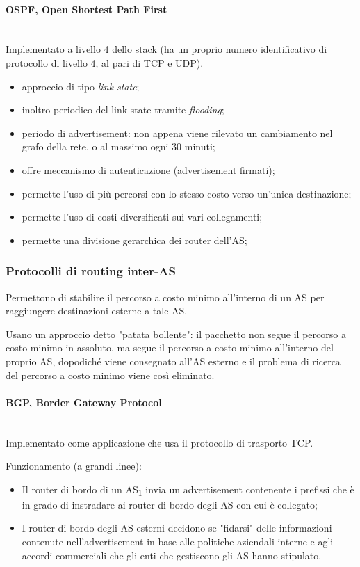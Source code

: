 \documentclass[12pt,a4paper]{article}
\begin{document}
\paragraph{OSPF, Open Shortest Path First}\mbox{}\\
Implementato a livello 4 dello stack (ha un proprio numero
identificativo di protocollo di livello 4, al pari di TCP e UDP).
\begin{itemize}
  \item approccio di tipo \emph{link state};
  \item inoltro periodico del link state tramite \emph{flooding};
  \item periodo di advertisement: non appena viene rilevato un
    cambiamento nel grafo della rete, o al massimo ogni 30 minuti;
  \item offre meccanismo di autenticazione (advertisement firmati);
  \item permette l'uso di più percorsi con lo stesso costo verso
    un'unica destinazione;
  \item permette l'uso di costi diversificati sui vari collegamenti;
  \item permette una divisione gerarchica dei router dell'AS;
\end{itemize}

\subsubsection{Protocolli di routing inter-AS}
Permettono di stabilire il percorso a costo minimo all'interno di un AS
per raggiungere destinazioni esterne a tale AS.

Usano un approccio detto "patata bollente": il pacchetto non segue il
percorso a costo minimo in assoluto, ma segue il percorso a costo minimo
all'interno del proprio AS, dopodiché viene consegnato all'AS esterno e
il problema di ricerca del percorso a costo minimo viene così eliminato.

\paragraph{BGP, Border Gateway Protocol}\mbox{}\\
Implementato come applicazione che usa il protocollo di trasporto TCP.

Funzionamento (a grandi linee):
\begin{itemize}
  \item Il router di bordo di un AS\textsubscript{1} invia un
    advertisement contenente i prefissi che è in grado di instradare ai
    router di bordo degli AS con cui è collegato;
  \item I router di bordo degli AS esterni decidono se "fidarsi" delle
    informazioni contenute nell'advertisement in base alle politiche
    aziendali interne e agli accordi commerciali che gli enti che
    gestiscono gli AS hanno stipulato.
\end{itemize}
\end{document}
